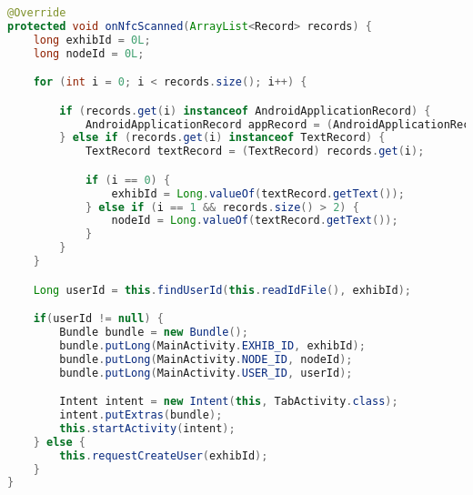 \begin{lstlisting}[language=java, label=lst:onNfcScanned, caption=onNfcScanned]
@Override
protected void onNfcScanned(ArrayList<Record> records) {
    long exhibId = 0L;
    long nodeId = 0L;

    for (int i = 0; i < records.size(); i++) {

        if (records.get(i) instanceof AndroidApplicationRecord) {
            AndroidApplicationRecord appRecord = (AndroidApplicationRecord) records.get(i);
        } else if (records.get(i) instanceof TextRecord) {
            TextRecord textRecord = (TextRecord) records.get(i);

            if (i == 0) {
                exhibId = Long.valueOf(textRecord.getText());
            } else if (i == 1 && records.size() > 2) {
                nodeId = Long.valueOf(textRecord.getText());
            }
        }
    }

    Long userId = this.findUserId(this.readIdFile(), exhibId);

    if(userId != null) {
        Bundle bundle = new Bundle();
        bundle.putLong(MainActivity.EXHIB_ID, exhibId);
        bundle.putLong(MainActivity.NODE_ID, nodeId);
        bundle.putLong(MainActivity.USER_ID, userId);

        Intent intent = new Intent(this, TabActivity.class);
        intent.putExtras(bundle);
        this.startActivity(intent);
    } else {
        this.requestCreateUser(exhibId);
    }
}
\end{lstlisting}
